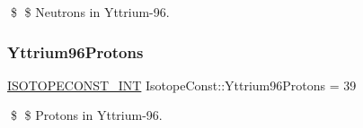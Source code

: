 \$ \$ Neutrons in Yttrium-\/96. \mbox{\label{group___isotope_const-_yttrium-_y96_ga7820171360a6ca71fa8332ae2cbe64d1}} 
\subsubsection{\texorpdfstring{Yttrium96\+Protons}{Yttrium96Protons}}
{\footnotesize\ttfamily \mbox{\hyperlink{group___isotope_const-_macros_ga5f18360b3e99483a35c32d789e62621c}{I\+S\+O\+T\+O\+P\+E\+C\+O\+N\+S\+T\+\_\+\+I\+NT}} Isotope\+Const\+::\+Yttrium96\+Protons = 39}

\$ \$ Protons in Yttrium-\/96. 
